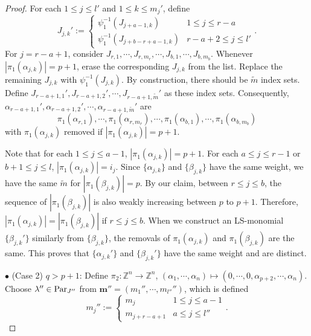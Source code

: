 \documentclass[12pt]{amsart}
\theoremstyle{definition}
\theoremstyle{remark}
\newcommand{\Z}{\mathbb{Z}}
\begin{document}
\begin{proof}
For each $1 \leq j \leq l'$ and $1 \leq k \leq m_j'$, define
\begin{equation}
J_{j,k}' :=
\begin{cases}
\psi_1^{-1} (J_{j+a-1,k}) & 1 \leq j \leq r-a \\
\psi_1^{-1} (J_{j+b-r+a-1,k}) & r-a+2 \leq j \leq l'
\end{cases}
.
\end{equation}
For $j = r-a+1$, consider $J_{r, 1} , \cdots , J_{r,m_r} , \cdots , J_{b,1} , \cdots , J_{b,m_b}$. Whenever $|\pi_1(\alpha_{j,k})| = p+1$, erase the corresponding $J_{j,k}$ from the list. Replace the remaining $J_{j,k}$ with $\psi_1^{-1} (J_{j,k})$. By construction, there should be $\tilde{m}$ index sets. Define $J_{r-a+1 , 1}' , J_{r-a+1 , 2}' , \cdots , J_{r-a+1,\tilde{m}}'$ as these index sets. Consequently, $\alpha_{r-a+1,1}' , \alpha_{r-a+1,2}' , \cdots , \alpha_{r-a+1,\tilde{m}}'$ are 
\begin{equation}
\pi_1 (\alpha_{r,1}) , \cdots , \pi_1 (\alpha_{r,m_r}) , \cdots , \pi_1 (\alpha_{b,1}) , \cdots , \pi_1 (\alpha_{b,m_b})
\end{equation}
with $\pi_1 (\alpha_{j,k})$ removed if $|\pi_1 (\alpha_{j,k})| = p+1$.

Note that for each $1 \leq j \leq a-1$, $|\pi_1 (\alpha_{j,k})| = p+1$. For each $a \leq j \leq r-1$ or $b+1 \leq j \leq l$, $|\pi_1 (\alpha_{j,k})| = i_j$. Since $\{ \alpha_{j,k} \}$ and $\{ \beta_{j,k} \}$ have the same weight, we have the same $\tilde{m}$ for $|\pi_1(\beta_{j,k})| = p$. By our claim, between $r \leq j \leq b$, the sequence of $|\pi_1(\beta_{j,k})|$ is also weakly increasing between $p$ to $p+1$. Therefore, $|\pi_1(\alpha_{j,k})| = |\pi_1(\beta_{j,k})|$ if $r \leq j \leq b$. When we construct an LS-monomial $\{ \beta_{j,k}' \}$ similarly from $\{ \beta_{j,k} \}$, the removals of $\pi_1 (\alpha_{j,k})$ and $\pi_1 (\beta_{j,k})$ are the same. This proves that $\{ \alpha_{j,k}' \}$ and $\{ \beta_{j,k}' \}$ have the same weight and are distinct.

$\bullet$ (Case 2) $q > p+1$: Define $\pi_2 : \Z^n \rightarrow \Z^n$, $(\alpha_1 , \cdots , \alpha_n ) \mapsto (0 , \cdots , 0 , \alpha_{p+2}  , \cdots , \alpha_n)$. Choose $\lambda '' \in {\rm Par}_{J''}$ from $\mathbf{m''} = (m_1 '' , \cdots , m_{l''}'')$, which is defined
\begin{equation}
m_{j}'':=
\begin{cases}
m_j & 1 \leq j \leq a-1 \\
m_{j+r-a+1} & a \leq j \leq l''
\end{cases}
.
\end{equation}


\end{proof}
\end{document}
